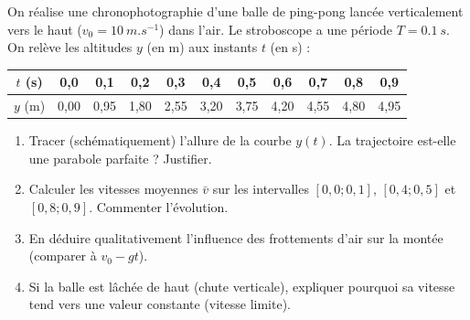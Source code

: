 \documentclass[11pt]{article}
\begin{document}
\begin{exercice}
On réalise une chronophotographie d'une balle de ping-pong lancée verticalement vers le haut ($v_0 = \SI{10}{m.s^{-1}}$) dans l'air. Le stroboscope a une période $T = \SI{0,1}{s}$. On relève les altitudes $y$ (en m) aux instants $t$ (en s) :

\begin{center}
\begin{tabular}{|c|c|c|c|c|c|c|c|c|c|c|}
\hline
$t$ (\si{s}) & 0,0 & 0,1 & 0,2 & 0,3 & 0,4 & 0,5 & 0,6 & 0,7 & 0,8 & 0,9 \\
\hline
$y$ (\si{m}) & 0,00 & 0,95 & 1,80 & 2,55 & 3,20 & 3,75 & 4,20 & 4,55 & 4,80 & 4,95 \\
\hline
\end{tabular}
\end{center}

\begin{enumerate}
    \item Tracer (schématiquement) l'allure de la courbe $y(t)$. La trajectoire est-elle une parabole parfaite ? Justifier.
    \item Calculer les vitesses moyennes $\bar{v}$ sur les intervalles $[0,0 ; 0,1]$, $[0,4 ; 0,5]$ et $[0,8 ; 0,9]$. Commenter l'évolution.
    \item En déduire qualitativement l'influence des frottements d'air sur la montée (comparer à $v_0 - gt$).
    \item Si la balle est lâchée de haut (chute verticale), expliquer pourquoi sa vitesse tend vers une valeur constante (vitesse limite).
\end{enumerate}
\end{exercice}
\end{document}
